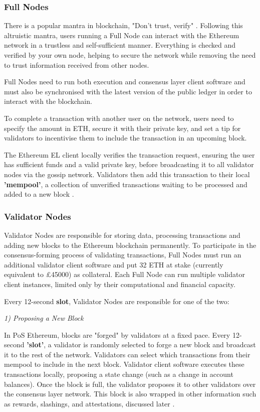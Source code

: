 \subsubsection{Full Nodes}
There is a popular mantra in blockchain, "Don't trust, verify" \cite{EthereumEthereum.org}. Following this altruistic mantra, users running a Full Node can interact with the Ethereum network in a trustless and self-sufficient manner. Everything is checked and verified by your own node, helping to secure the network while removing the need to trust information received from other nodes. 

Full Nodes need to run both execution and consensus layer client software and must also be synchronised with the latest version of the public ledger in order to interact with the blockchain. 

To complete a transaction with another user on the network, users need to specify the amount in ETH, secure it with their private key, and set a tip for validators to incentivise them to include the transaction in an upcoming block.

The Ethereum EL client locally verifies the transaction request, ensuring the user has sufficient funds and a valid private key, before broadcasting it to all validator nodes via the gossip network. Validators then add this transaction to their local \textbf{'mempool'}, a collection of unverified transactions waiting to be processed and added to a new block \cite{EthereumEthereum.org}.

\subsubsection{Validator Nodes}
\label{ValidatorsLitRev}
Validator Nodes are responsible for storing data, processing transactions and adding new blocks to the Ethereum blockchain permanently. To participate in the consensus-forming process of validating transactions, Full Nodes must run an additional validator client software and put 32 ETH at stake (currently equivalent to £45000) as collateral. Each Full Node can run multiple validator client instances, limited only by their computational and financial capacity.

Every 12-second \textbf{slot}, Validator Nodes are responsible for one of the two:

\textit{1) Proposing a New Block}

In PoS Ethereum, blocks are "forged" by validators at a fixed pace. Every 12-second \textbf{'slot'}, a validator is randomly selected to forge a new block and broadcast it to the rest of the network. Validators can select which transactions from their mempool to include in the next block. Validator client software executes these transactions locally, proposing a state change (such as a change in account balances). Once the block is full, the validator proposes it to other validators over the consensus layer network. This block is also wrapped in other information such as rewards, slashings, and attestations, discussed later \cite{EthereumEthereum.org}.

